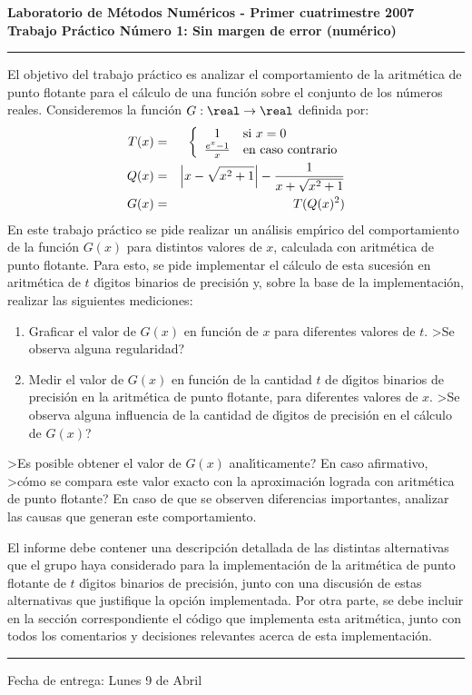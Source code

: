 \documentclass[11pt, a4paper]{article}
\begin{document}
\begin{centering}
\bf Laboratorio de M\'etodos Num\'ericos - Primer cuatrimestre 2007 \\
\bf Trabajo Pr\'actico N\'umero 1: Sin margen de error (num\'erico) \\
\end{centering}

\vskip 25pt
\hrule
\vskip 11pt

El objetivo del trabajo pr\'actico es analizar el comportamiento de la
aritm\'etica de punto flotante para el c\'alculo de una funci\'on sobre
el conjunto de los n\'umeros reales. Consideremos la funci\'on
$G:\real\to\real$ definida por:
\begin{eqnarray}
T(x) & = & \left\{ \begin{array}{cl}
                      1 & \hbox{si } x = 0 \\
                      \frac{e^x-1}{x} & \hbox{en caso contrario}
                    \end{array} \right. \nonumber \\
Q(x) & = & \Big|x - \sqrt{x^2+1} \Big| - \frac{1}{x+\sqrt{x^2+1}} \nonumber \\
G(x) & = & T( Q(x)^2 ) \nonumber
\end{eqnarray}
En este trabajo pr\'actico se pide realizar un an\'alisis emp\'\i rico
del comportamiento de la funci\'on $G(x)$ para distintos valores de $x$,
calculada con aritm\'etica de punto flotante. Para esto, se pide implementar
el c\'alculo de esta sucesi\'on en aritm\'etica de $t$ d\'\i gitos binarios
de precisi\'on y, sobre la base de la implementaci\'on, realizar las
siguientes mediciones:
\begin{enumerate}
\item Graficar el valor de $G(x)$ en funci\'on de $x$ para diferentes
valores de $t$. >Se observa alguna regularidad?
\item Medir el valor de $G(x)$ en funci\'on de la cantidad $t$ de d\'\i gitos
binarios de precisi\'on en la aritm\'etica de punto flotante, para diferentes
valores de $x$. >Se observa alguna influencia de la cantidad de d\'\i gitos
de precisi\'on en el c\'alculo de $G(x)$?
\end{enumerate}

>Es posible obtener el valor de $G(x)$ anal\'\i ticamente? En caso afirmativo,
>c\'omo se compara este valor exacto con la aproximaci\'on lograda con
aritm\'etica de punto flotante? En caso de que se observen diferencias
importantes, analizar las causas que generan este comportamiento.

El informe debe contener una descripci\'on detallada de las distintas
alternativas que el grupo haya considerado para la implementaci\'on de la
aritm\'etica de punto flotante de $t$ d\'\i gitos binarios de precisi\'on, junto
con una discusi\'on de estas alternativas que justifique la opci\'on
implementada. Por otra parte, se debe incluir en la secci\'on correspondiente
el c\'odigo que implementa esta aritm\'etica, junto con todos los comentarios
y decisiones relevantes acerca de esta implementaci\'on.

\vskip 15pt

\hrule

\vskip 11pt

Fecha de entrega: Lunes 9 de Abril
\end{document}

